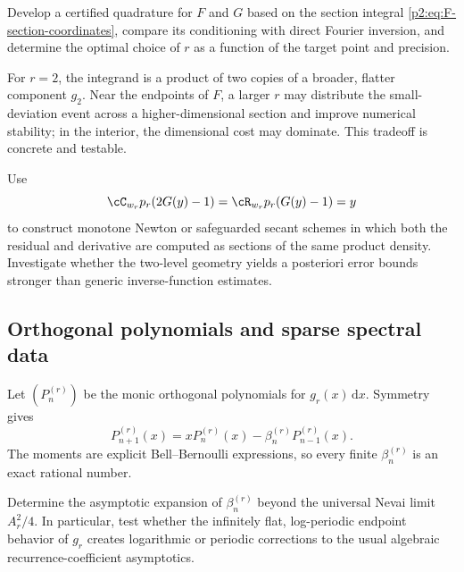 \documentclass[11pt,oneside]{article}
\theoremstyle{definition}
\newcommand{\dd}{\,\mathrm d}
\begin{document}
\begin{problem}
Develop a certified quadrature for $F$ and $G$ based on the section integral
\eqref{p2:eq:F-section-coordinates}, compare its conditioning with direct Fourier
inversion, and determine the optimal choice of $r$ as a function of the target
point and precision.
\end{problem}

For $r=2$, the integrand is a product of two copies of a broader, flatter
component $g_2$.  Near the endpoints of $F$, a larger $r$ may distribute the
small-deviation event across a higher-dimensional section and improve numerical
stability; in the interior, the dimensional cost may dominate.  This tradeoff
is concrete and testable.

\begin{problem}
Use
\begin{equation}
 \cC_{w_r}p_r(2G(y)-1)=\cR_{w_r}p_r(G(y)-1)=y              \label{p2:eq:quantile-tomography-problem}
\end{equation}
to construct monotone Newton or safeguarded secant schemes in which both the
residual and derivative are computed as sections of the same product density.
Investigate whether the two-level geometry yields a posteriori error bounds
stronger than generic inverse-function estimates.
\end{problem}

\subsection{Orthogonal polynomials and sparse spectral data}

Let $(P_n^{(r)})$ be the monic orthogonal polynomials for $g_r(x)\dd x$.
Symmetry gives
\begin{equation}
 P_{n+1}^{(r)}(x)=xP_n^{(r)}(x)-\beta_n^{(r)}P_{n-1}^{(r)}(x). \label{p2:eq:sparse-Jacobi}
\end{equation}
The moments are explicit Bell--Bernoulli expressions, so every finite
$\beta_n^{(r)}$ is an exact rational number.

\begin{problem}
Determine the asymptotic expansion of $\beta_n^{(r)}$ beyond the universal
Nevai limit $A_r^2/4$.  In particular, test whether the infinitely flat,
log-periodic endpoint behavior of $g_r$ creates logarithmic or periodic
corrections to the usual algebraic recurrence-coefficient asymptotics.
\end{problem}
\end{document}
